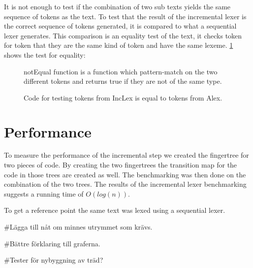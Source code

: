 It is not enough to test if the combination of two sub texts yields the
same sequence of tokens as the text. To test that the result of the
incremental lexer is the correct sequence of tokens generated, it is compared to
what a sequential lexer generates. This comparison is an equality test of
the text, it checks token for token that they are the same kind of token and
have the same lexeme.
\cref{fig:CheckEquility} shows the test for equality:
\begin{figure}[h!]
  \centering
  
  notEqual function is a function which pattern-match on the two different
  tokens and returns true if they are not of the same type.
  \caption{Code for testing tokens from IncLex is equal to tokens from Alex. 
  \label{fig:CheckEquility}}
\end{figure} 

\section{Performance}
To measure the performance of the incremental step we created the fingertree for
two pieces of code. By creating the two fingertrees the transition map for the
code in those trees are created as well. The benchmarking was then done on the
combination of the two trees. The results of the incremental lexer benchmarking
suggests a running time of $O(log(n))$.

To get a reference point the same text was lexed using a sequential lexer.

\#Lägga till nåt om minnes utrymmet som krävs.

\#Bättre förklaring till graferna.

\#Tester för nybyggning av träd?

